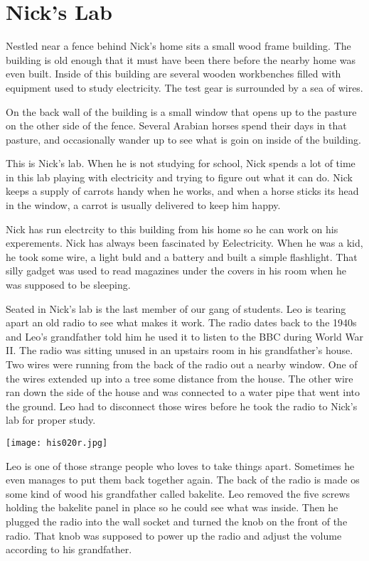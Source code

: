 \chapter{Nick's Lab}

Nestled near a fence behind Nick's home sits a small wood frame building. The
building is old enough that it must have been there before the nearby home was even 
built.  Inside of this building are several wooden workbenches filled with equipment
used to study electricity. The test gear is surrounded by a sea of wires. 

On the back wall of the building is a small window that opens up to the pasture
on the other side of the fence. Several Arabian horses spend their days in that
pasture, and occasionally wander up to see what is goin on inside of the
building. 

This is Nick's lab. When he is not studying for school, Nick spends a lot of
time in this lab playing with electricity and trying to figure out what it can do.
Nick keeps a supply of carrots handy when he works, and when a horse sticks its
head in the window, a carrot is usually delivered to keep him happy.

Nick has run electrcity to this building from his home so he can work on his experements.
Nick has always been fascinated by Eelectricity. When he was a kid, he took some wire, a
light buld and a battery and built a simple flashlight. That silly gadget was
used to read magazines under the covers in his room when he was supposed to be
sleeping.

Seated in Nick's lab is the last member of our gang of students. Leo is tearing
apart an old radio to see what makes it work. The radio dates back to the 1940s
and Leo's grandfather told him he used it to listen to the BBC during World War
II. The radio was sitting unused in an upstairs room in his grandfather's
house. Two wires were running from the back of the radio out a nearby window.
One of the wires extended up into a tree some distance from the house. The
other wire ran down the side of the house and was connected to a water pipe
that went into the ground. Leo had to disconnect those wires before he took the
radio to Nick's lab for proper study.

\texttt{[image: his020r.jpg]}

Leo is one of those strange people who loves to take things apart. Sometimes he
even manages to put them back together again. The back of the radio is made os
some kind of wood his grandfather called bakelite. Leo removed the five screws
holding the bakelite panel in place so he could see what was inside. Then he
plugged the radio into the wall socket and turned the knob on the front of the
radio. That knob was supposed to power up the radio and adjust the volume
according to his grandfather.

